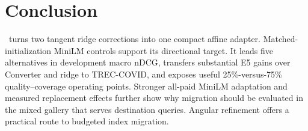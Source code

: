 \section{Conclusion}
\method\ turns two tangent ridge corrections into one compact affine adapter.
Matched-initialization MiniLM controls support its directional target.
It leads five alternatives in development macro nDCG, transfers substantial
E5 gains over Converter and ridge to TREC-COVID, and exposes useful
25\%-versus-75\% quality--coverage operating points. Stronger all-paid
MiniLM adaptation and measured replacement effects further show why
migration should be evaluated in the mixed gallery that serves destination
queries. Angular refinement offers a practical route to budgeted index migration.
